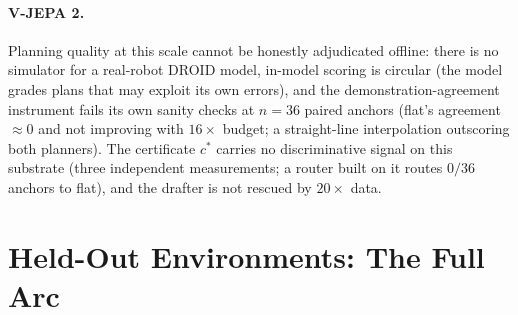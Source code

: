 \documentclass{article}
\begin{document}
\paragraph{V-JEPA 2.} Planning quality at this scale cannot be honestly
adjudicated offline: there is no simulator for a real-robot DROID model,
in-model scoring is circular (the model grades plans that may exploit its own
errors), and the demonstration-agreement instrument fails its own sanity
checks at $n{=}36$ paired anchors (flat's agreement ${\approx}0$ and not
improving with $16\times$ budget; a straight-line interpolation outscoring
both planners). The certificate $c^{*}$ carries no discriminative signal on
this substrate (three independent measurements; a router built on it routes
$0/36$ anchors to flat), and the drafter is not rescued by $20\times$ data.

\section{Held-Out Environments: The Full Arc}\label{app:heldout}
\end{document}
